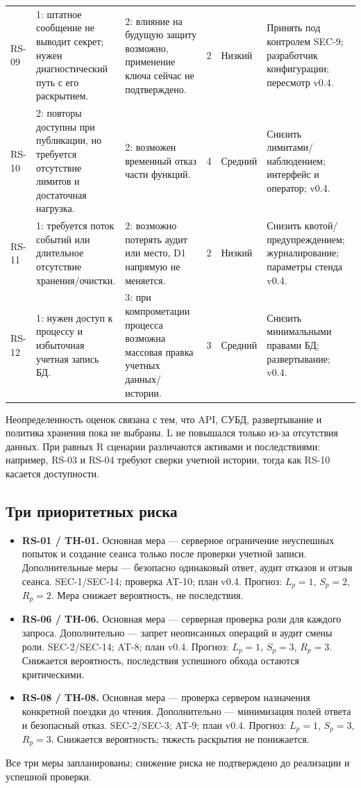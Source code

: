 \documentclass[12pt,a4paper]{article}
\begin{document}
\begin{longtable}{@{}p{0.9cm}p{3.5cm}p{3.5cm}p{0.9cm}p{1.2cm}p{3.8cm}@{}}
RS-09 & 1: штатное сообщение не выводит секрет; нужен диагностический путь с его раскрытием. & 2: влияние на будущую защиту возможно, применение ключа сейчас не подтверждено. & 2 & Низкий & Принять под контролем SEC-9; разработчик конфигурации; пересмотр v0.4.\\
RS-10 & 2: повторы доступны при публикации, но требуется отсутствие лимитов и достаточная нагрузка. & 2: возможен временный отказ части функций. & 4 & Средний & Снизить лимитами/наблюдением; интерфейс и оператор; v0.4.\\
RS-11 & 1: требуется поток событий или длительное отсутствие хранения/очистки. & 2: возможно потерять аудит или место, D1 напрямую не меняется. & 2 & Низкий & Снизить квотой/предупреждением; журналирование; параметры стенда v0.4.\\
RS-12 & 1: нужен доступ к процессу и избыточная учетная запись БД. & 3: при компрометации процесса возможна массовая правка учетных данных/истории. & 3 & Средний & Снизить минимальными правами БД; развертывание; v0.4.\\
\bottomrule
\end{longtable}
\normalsize

Неопределенность оценок связана с тем, что API, СУБД, развертывание и политика хранения пока не выбраны. L не повышался только из-за отсутствия данных. При равных R сценарии различаются активами и последствиями: например, RS-03 и RS-04 требуют сверки учетной истории, тогда как RS-10 касается доступности.

\subsection{Три приоритетных риска}
\begin{itemize}[leftmargin=1.2cm]
\item \textbf{RS-01 / TH-01.} Основная мера — серверное ограничение неуспешных попыток и создание сеанса только после проверки учетной записи. Дополнительные меры — безопасно одинаковый ответ, аудит отказов и отзыв сеанса. SEC-1/SEC-14; проверка AT-10; план v0.4. Прогноз: \(L_p=1\), \(S_p=2\), \(R_p=2\). Мера снижает вероятность, не последствия.
\item \textbf{RS-06 / TH-06.} Основная мера — серверная проверка роли для каждого запроса. Дополнительно — запрет неописанных операций и аудит смены роли. SEC-2/SEC-14; AT-8; план v0.4. Прогноз: \(L_p=1\), \(S_p=3\), \(R_p=3\). Снижается вероятность, последствия успешного обхода остаются критическими.
\item \textbf{RS-08 / TH-08.} Основная мера — проверка сервером назначения конкретной поездки до чтения. Дополнительно — минимизация полей ответа и безопасный отказ. SEC-2/SEC-3; AT-9; план v0.4. Прогноз: \(L_p=1\), \(S_p=3\), \(R_p=3\). Снижается вероятность; тяжесть раскрытия не понижается.
\end{itemize}
Все три меры запланированы; снижение риска не подтверждено до реализации и успешной проверки.
\end{document}
